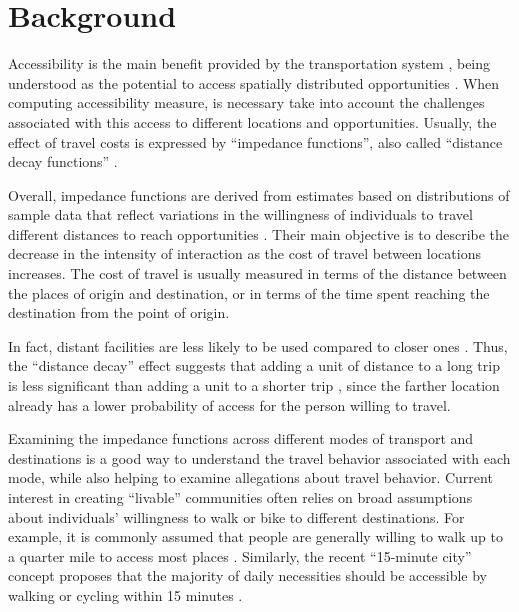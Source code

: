 \documentclass[preprint, 3p,
authoryear]{elsarticle} %
\begin{document}
\section{Background}\label{background}

Accessibility is the main benefit provided by the transportation system
\citep{pereira2017}, being understood as the potential to access
spatially distributed opportunities
\citep{hansen1959accessibility, paez2012}. When computing accessibility
measure, is necessary take into account the challenges associated with
this access to different locations and opportunities. Usually, the
effect of travel costs is expressed by ``impedance functions'', also
called ``distance decay functions''
\citep{hansen1959accessibility, koenig1980indicators, fotheringham1981spatial}.

Overall, impedance functions are derived from estimates based on
distributions of sample data that reflect variations in the willingness
of individuals to travel different distances to reach opportunities
\citep{hsiao1997use, zhao2003forecasting, iacono2010, li2020approach}.
Their main objective is to describe the decrease in the intensity of
interaction as the cost of travel between locations increases. The cost
of travel is usually measured in terms of the distance between the
places of origin and destination, or in terms of the time spent reaching
the destination from the point of origin.

In fact, distant facilities are less likely to be used compared to
closer ones
\citep{hansen1959accessibility, koenig1980indicators, fotheringham1981spatial, skov2001estimation}.
Thus, the ``distance decay'' effect suggests that adding a unit of
distance to a long trip is less significant than adding a unit to a
shorter trip \citep{carrothers1956historical}, since the farther
location already has a lower probability of access for the person
willing to travel.

Examining the impedance functions across different modes of transport
and destinations is a good way to understand the travel behavior
associated with each mode, while also helping to examine allegations
about travel behavior. Current interest in creating ``livable''
communities often relies on broad assumptions about individuals'
willingness to walk or bike to different destinations. For example, it
is commonly assumed that people are generally willing to walk up to a
quarter mile to access most places \citep{untermann1984accommodating}.
Similarly, the recent ``15-minute city'' concept proposes that the
majority of daily necessities should be accessible by walking or cycling
within 15 minutes \citep{moreno2021}.
\end{document}
